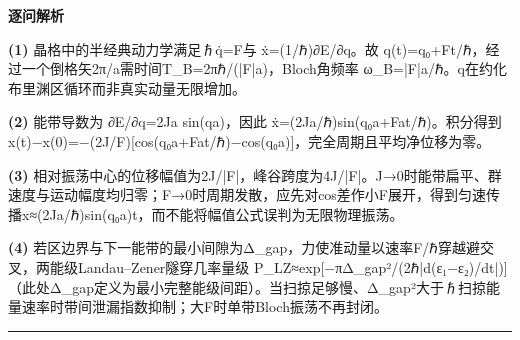 \documentclass[UTF8,a4paper,11pt,oneside,openany]{ctexbook}
\begin{document}
\par\medskip\noindent\textbf{逐问解析}
\par\noindent\textbf{(1)} 晶格中的半经典动力学满足ℏq̇=F与 ẋ=(1/ℏ)∂E/∂q。故 q(t)=q₀+Ft/ℏ，经过一个倒格矢2π/a需时间T\_B=2πℏ/(|F|a)，Bloch角频率 ω\_B=|F|a/ℏ。q在约化布里渊区循环而非真实动量无限增加。
\par\noindent\textbf{(2)} 能带导数为 ∂E/∂q=2Ja sin(qa)，因此 ẋ=(2Ja/ℏ)sin(q₀a+Fat/ℏ)。积分得到 x(t)−x(0)=−(2J/F)[cos(q₀a+Fat/ℏ)−cos(q₀a)]，完全周期且平均净位移为零。
\par\noindent\textbf{(3)} 相对振荡中心的位移幅值为2J/|F|，峰谷跨度为4J/|F|。J→0时能带扁平、群速度与运动幅度均归零；F→0时周期发散，应先对cos差作小F展开，得到匀速传播x≈(2Ja/ℏ)sin(q₀a)t，而不能将幅值公式误判为无限物理振荡。
\par\noindent\textbf{(4)} 若区边界与下一能带的最小间隙为Δ\_gap，力使准动量以速率F/ℏ穿越避交叉，两能级Landau–Zener隧穿几率量级 P\_LZ≈exp[−πΔ\_gap²/(2ℏ|d(ε₁−ε₂)/dt|)]（此处Δ\_gap定义为最小完整能级间距）。当扫掠足够慢、Δ\_gap²大于ℏ扫掠能量速率时带间泄漏指数抑制；大F时单带Bloch振荡不再封闭。

\par\bigskip\hrule\bigskip
\end{document}
